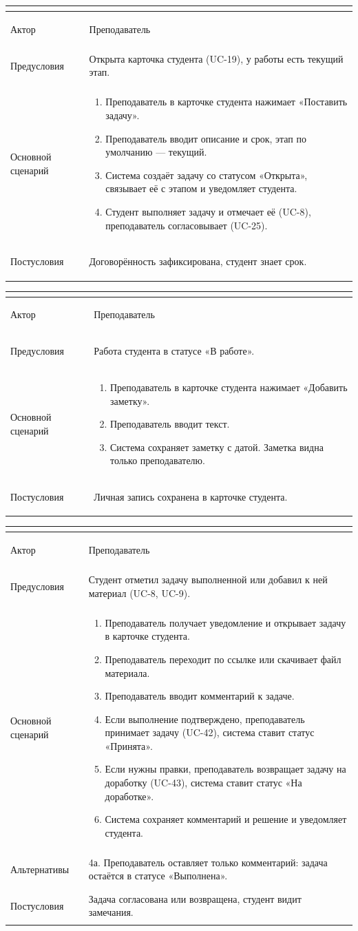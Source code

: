 \documentclass[a4paper,12pt]{article}
\newenvironment{ucd}[3]{%
  \needspace{10\baselineskip}
  \begin{longtable}{|>{\bfseries\raggedright\arraybackslash}p{3.0cm}|p{11.8cm}|}
  \hline
  \multicolumn{2}{|l|}{\textbf{#1.\ #2}}\\ \hline
  Актор & #3\\ \hline
}{\end{longtable}}
\newcommand{\steps}[1]{\begin{enumerate}[nosep,leftmargin=*]#1\end{enumerate}}
\begin{document}
\begin{ucd}{UC-23}{Поставить студенту задачу в рамках этапа}{Преподаватель}
Предусловия & Открыта карточка студента (UC-19), у работы есть текущий этап.\\ \hline
Основной сценарий & \steps{
 \item Преподаватель в карточке студента нажимает «Поставить задачу».
 \item Преподаватель вводит описание и срок, этап по умолчанию — текущий.
 \item Система создаёт задачу со статусом «Открыта», связывает её с этапом и уведомляет студента.
 \item Студент выполняет задачу и отмечает её (UC-8), преподаватель согласовывает (UC-25).}\\ \hline
Постусловия & Договорённость зафиксирована, студент знает срок.\\ \hline
\end{ucd}

\begin{ucd}{UC-24}{Оставить заметку о студенте}{Преподаватель}
Предусловия & Работа студента в статусе «В работе».\\ \hline
Основной сценарий & \steps{
 \item Преподаватель в карточке студента нажимает «Добавить заметку».
 \item Преподаватель вводит текст.
 \item Система сохраняет заметку с датой. Заметка видна только преподавателю.}\\ \hline
Постусловия & Личная запись сохранена в карточке студента.\\ \hline
\end{ucd}

\begin{ucd}{UC-25}{Проверить задачу и материалы студента, оставить комментарий}{Преподаватель}
Предусловия & Студент отметил задачу выполненной или добавил к ней материал (UC-8, UC-9).\\ \hline
Основной сценарий & \steps{
 \item Преподаватель получает уведомление и открывает задачу в карточке студента.
 \item Преподаватель переходит по ссылке или скачивает файл материала.
 \item Преподаватель вводит комментарий к задаче.
 \item Если выполнение подтверждено, преподаватель принимает задачу (UC-42), система ставит статус «Принята».
 \item Если нужны правки, преподаватель возвращает задачу на доработку (UC-43), система ставит статус «На доработке».
 \item Система сохраняет комментарий и решение и уведомляет студента.}\\ \hline
Альтернативы & 4а. Преподаватель оставляет только комментарий: задача остаётся в статусе «Выполнена».\\ \hline
Постусловия & Задача согласована или возвращена, студент видит замечания.\\ \hline
\end{ucd}
\end{document}
